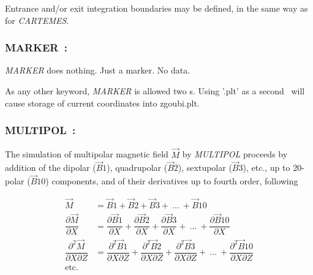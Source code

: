 \medskip

\noindent Entrance and/or 
exit integration boundaries may be defined, in the same way as for \textsl{CARTEMES}.




\newpage

\subsubsection*{MARKER~: \MARKERTitl} \label{MARKER} 
\medskip

\textsl{MARKER} does nothing. Just a marker. No data. 

\bigskip

As any other keyword, \textsl{MARKER} is allowed two \LABEL s. Using 
 '.plt' as a second \LABEL\ will cause storage of current coordinates into 
zgoubi.plt. 





\newpage

\subsubsection*{MULTIPOL~:  \MULTIPOLTitl} \label{MULTIPOL}
\medskip 

The simulation of  multipolar magnetic field $ \vec  M $ by \textsl{MULTIPOL}  proceeds 
by addition of the dipolar  ($\vec  B1$),  quadrupolar ($ \vec  B2 $), sextupolar 
($ \vec  B3 $), etc., up to 20-polar  ($\vec  B10$) 
components, and of their derivatives up to fourth order, following

\begin{align*}
	\vec  M &   =   \vec B1+\vec  B2+\vec  B3+ \ ...\ +\vec  B10  \\ 
	\dfrac{ \partial\vec M }{ \partial X} 
	        &   = \dfrac{ \partial\vec  B1}{ \partial X} + 
	        \dfrac{\partial\vec  B2 }{ \partial X} + 
	        \dfrac{\partial\vec  B3}{ \partial X} + 
                            \ ...\ +
	        \dfrac{\partial\vec  B10 }{ \partial X} \\
	\dfrac{ \partial^ 2\vec  M }{ \partial X\partial Z} 
	       & = \dfrac{ \partial^ 2\vec  B1 }{ \partial X\partial Z} + 
	       \dfrac{\partial^ 2\vec  B2 }{ \partial X\partial Z} + 
	       \dfrac{\partial^ 2\vec  B3}{ \partial X\partial Z} + 
                            \ ...\ +
 	       \dfrac{\partial^ 2\vec  B10}{ \partial X\partial Z} \\
	\text{etc. } &
\end{align*}


